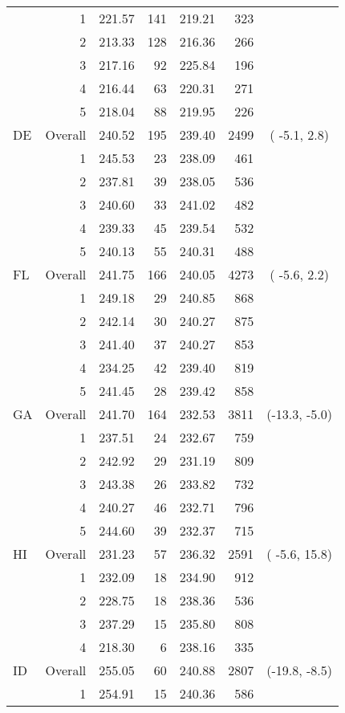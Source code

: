 \begin{longtable}{lrrr@{\extracolsep{.25cm}}rrc}
   & 1 & 221.57 & 141 & 219.21 & 323 &  \\ 
   & 2 & 213.33 & 128 & 216.36 & 266 &  \\ 
   & 3 & 217.16 &  92 & 225.84 & 196 &  \\ 
   & 4 & 216.44 &  63 & 220.31 & 271 &  \\ 
   & 5 & 218.04 &  88 & 219.95 & 226 &  \\ 
   \hline
DE & Overall & 240.52 & 195 & 239.40 & 2499 & ( -5.1,  2.8) \\ 
   & 1 & 245.53 &  23 & 238.09 & 461 &  \\ 
   & 2 & 237.81 &  39 & 238.05 & 536 &  \\ 
   & 3 & 240.60 &  33 & 241.02 & 482 &  \\ 
   & 4 & 239.33 &  45 & 239.54 & 532 &  \\ 
   & 5 & 240.13 &  55 & 240.31 & 488 &  \\ 
   \hline
FL & Overall & 241.75 & 166 & 240.05 & 4273 & ( -5.6,  2.2) \\ 
   & 1 & 249.18 &  29 & 240.85 & 868 &  \\ 
   & 2 & 242.14 &  30 & 240.27 & 875 &  \\ 
   & 3 & 241.40 &  37 & 240.27 & 853 &  \\ 
   & 4 & 234.25 &  42 & 239.40 & 819 &  \\ 
   & 5 & 241.45 &  28 & 239.42 & 858 &  \\ 
   \hline
GA & Overall & 241.70 & 164 & 232.53 & 3811 & (-13.3, -5.0) \\ 
   & 1 & 237.51 &  24 & 232.67 & 759 &  \\ 
   & 2 & 242.92 &  29 & 231.19 & 809 &  \\ 
   & 3 & 243.38 &  26 & 233.82 & 732 &  \\ 
   & 4 & 240.27 &  46 & 232.71 & 796 &  \\ 
   & 5 & 244.60 &  39 & 232.37 & 715 &  \\ 
   \hline
HI & Overall & 231.23 &  57 & 236.32 & 2591 & ( -5.6, 15.8) \\ 
   & 1 & 232.09 &  18 & 234.90 & 912 &  \\ 
   & 2 & 228.75 &  18 & 238.36 & 536 &  \\ 
   & 3 & 237.29 &  15 & 235.80 & 808 &  \\ 
   & 4 & 218.30 &   6 & 238.16 & 335 &  \\ 
   \hline
ID & Overall & 255.05 &  60 & 240.88 & 2807 & (-19.8, -8.5) \\ 
   & 1 & 254.91 &  15 & 240.36 & 586 &  \\ 

\end{longtable}
